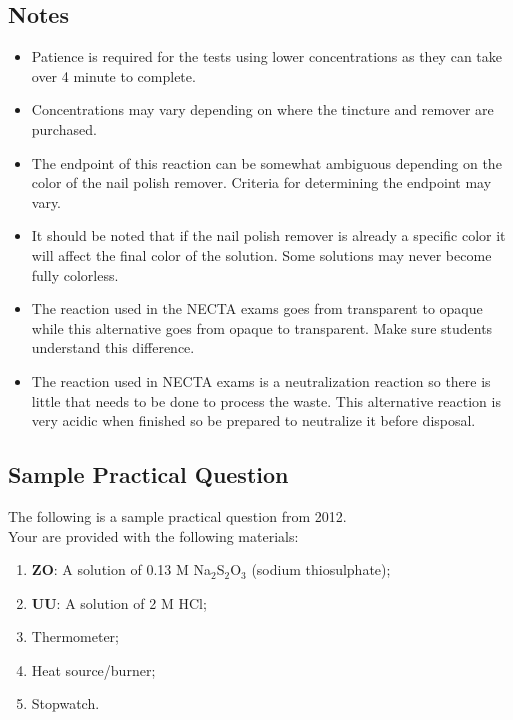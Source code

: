 \subsection{Notes}
\begin{itemize}
\item Patience is required for the tests using lower concentrations as they can take over 4 minute to complete.
\item Concentrations may vary depending on where the tincture and remover are purchased.
\item The endpoint of this reaction can be somewhat ambiguous depending on the color of the nail polish remover. Criteria for determining the endpoint may vary.
\item It should be noted that if the nail polish remover is already a specific color it will affect the final color of the solution. Some solutions may never become fully colorless.
\item The reaction used in the NECTA exams goes from transparent to opaque while this alternative goes from opaque to transparent. Make sure students understand this difference.
\item The reaction used in NECTA exams is a neutralization reaction so there is little that needs to be done to process the waste. This alternative reaction is very acidic when finished so be prepared to 	neutralize it before disposal.
\end{itemize}

\subsection{Sample Practical Question}
The following is a sample practical question from 2012.\\[6pt]



Your are provided with the following materials:\\
\begin{enumerate}
\item[ ] \textbf{ZO}:  A solution of 0.13 M Na$_2$S$_2$O$_3$ (sodium thiosulphate);
\item[ ] \textbf{UU}:  A solution of 2 M HCl;
\item[ ] Thermometer;
\item[ ] Heat source/burner;
\item[ ] Stopwatch.\\
\end{enumerate}

